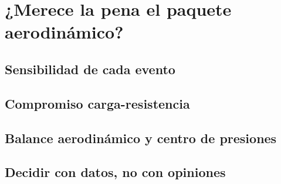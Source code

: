 \chapter{¿Merece la pena el paquete aerodinámico?}
\label{ch:merece_la_pena_aero}

\begin{objetivos}
  \item {}
  \item {}
  \item {}
\end{objetivos}


\section{Sensibilidad de cada evento}
\label{sec:merece_la_pena_aero:01}

\section{Compromiso carga-resistencia}
\label{sec:merece_la_pena_aero:02}

\section{Balance aerodinámico y centro de presiones}
\label{sec:merece_la_pena_aero:03}

\section{Decidir con datos, no con opiniones}
\label{sec:merece_la_pena_aero:04}


\begin{caso}
\end{caso}

